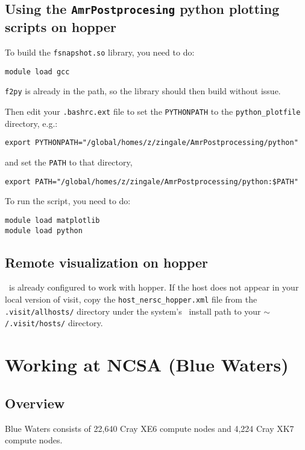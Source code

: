 \subsection{Using the {\tt AmrPostprocesing} python plotting scripts on hopper}

To build the {\tt fsnapshot.so} library, you need to do:
\begin{verbatim}
module load gcc
\end{verbatim}
{\tt f2py} is already in the path, so the library should then build without issue.
%

Then edit your {\tt .bashrc.ext} file to set the {\tt PYTHONPATH} to
the {\tt python\_plotfile} directory, e.g.:
\begin{verbatim}
export PYTHONPATH="/global/homes/z/zingale/AmrPostprocessing/python"
\end{verbatim}
%
and set the {\tt PATH} to that directory,
\begin{verbatim}
export PATH="/global/homes/z/zingale/AmrPostprocessing/python:$PATH"
\end{verbatim}

To run the script, you need to do:
\begin{verbatim}
module load matplotlib
module load python
\end{verbatim}



\subsection{Remote visualization on hopper}

\visit\ is already configured to work with hopper.  If the host does not appear
in your local version of visit, copy the {\tt host\_nersc\_hopper.xml} file
from the {\tt .visit/allhosts/} directory under the system's \visit\ install path
to your {\tt $\mathtt{\sim}$/.visit/hosts/} directory. 



\section{Working at NCSA (Blue Waters)}

\subsection{Overview}

Blue Waters consists of 22,640 Cray XE6 compute nodes and 4,224
Cray XK7 compute nodes.

